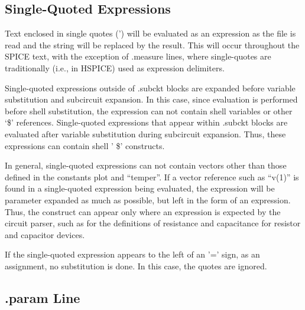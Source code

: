 
\subsection{Single-Quoted Expressions}
Text enclosed in single quotes (') will be evaluated as an expression
as the file is read and the string will be replaced by the result. 
This will occur throughout the SPICE text, with the exception of {\vt
.measure} lines, where single-quotes are traditionally (i.e., in
HSPICE) used as expression delimiters.

Single-quoted expressions outside of {\vt .subckt} blocks are expanded
before variable substitution and subcircuit expansion.  In this case,
since evaluation is performed before shell substitution, the
expression can not contain shell variables or other `{\vt \$}'
references.  Single-quoted expressions that appear within {\vt
.subckt} blocks are evaluated after variable substitution during
subcircuit expansion.  Thus, these expressions can contain shell '{\vt
\$}' constructs.

In general, single-quoted expressions can not contain vectors other
than those defined in the constants plot and ``{\vt temper}''.  If a
vector reference such as ``{\vt v(1)}'' is found in a single-quoted
expression being evaluated, the expression will be parameter expanded
as much as possible, but left in the form of an expression.  Thus, the
construct can appear only where an expression is expected by the
circuit parser, such as for the definitions of resistance and
capacitance for resistor and capacitor devices.

If the single-quoted expression appears to the left of an '=' sign, as
an assignment, no substitution is done.  In this case, the quotes are
ignored.

\subsection{{\vt .param} Line}


